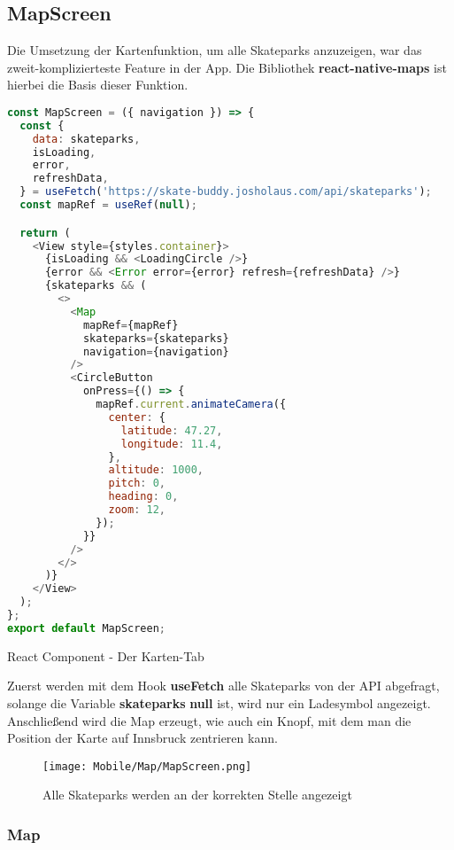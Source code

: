 \subsection{MapScreen}
Die Umsetzung der Kartenfunktion, um alle Skateparks anzuzeigen, war das zweit-komplizierteste
Feature in der App. Die Bibliothek \textbf{react-native-maps} ist hierbei die Basis dieser Funktion.

\begin{code}[htp]
\begin{lstlisting}[firstnumber=1,language=JavaScript, style=JSX]
const MapScreen = ({ navigation }) => {
  const {
    data: skateparks,
    isLoading,
    error,
    refreshData,
  } = useFetch('https://skate-buddy.josholaus.com/api/skateparks');
  const mapRef = useRef(null);

  return (
    <View style={styles.container}>
      {isLoading && <LoadingCircle />}
      {error && <Error error={error} refresh={refreshData} />}
      {skateparks && (
        <>
          <Map
            mapRef={mapRef}
            skateparks={skateparks}
            navigation={navigation}
          />
          <CircleButton
            onPress={() => {
              mapRef.current.animateCamera({
                center: {
                  latitude: 47.27,
                  longitude: 11.4,
                },
                altitude: 1000,
                pitch: 0,
                heading: 0,
                zoom: 12,
              });
            }}
          />
        </>
      )}
    </View>
  );
};
export default MapScreen;
\end{lstlisting}
\caption{React Component - Der Karten-Tab}
\end{code}

Zuerst werden mit dem Hook \textbf{useFetch} alle Skateparks von der API abgefragt, solange die Variable
\textbf{skateparks} \textbf{null} ist, wird nur ein Ladesymbol angezeigt. Anschließend wird die Map erzeugt, wie auch
ein Knopf, mit dem man die Position der Karte auf Innsbruck zentrieren kann.

\begin{figure}[H]
  \begin{center}
    \texttt{[image: Mobile/Map/MapScreen.png]}
    \caption{Alle Skateparks werden an der korrekten Stelle angezeigt}
  \end{center}
\end{figure}

\newpage
\subsubsection{Map}

